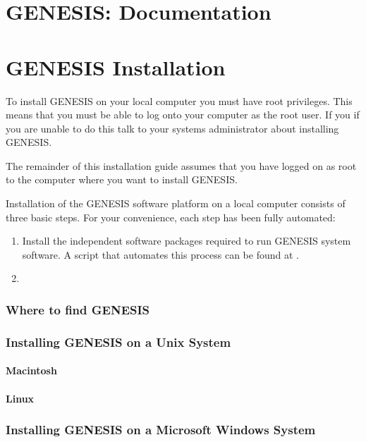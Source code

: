 \documentclass[12pt]{article}
\begin{document}
\section*{GENESIS: Documentation}

\section*{GENESIS Installation}

To install GENESIS on your local computer you must have root privileges. This means that you must be able to log onto your computer as the root user. If you if you are unable to do this talk to your systems administrator about installing GENESIS.

The remainder of this installation guide assumes that you have logged on as root to the computer where you want to install GENESIS.

Installation of the GENESIS software platform on a local computer consists of three basic steps. For your convenience, each step has been fully automated:

\begin {enumerate}

\item Install the independent software packages required to run GENESIS system software. A script that automates this process can be found at \href{}{}.

\item 

\end{enumerate}

\subsubsection*{Where to find GENESIS}

\subsubsection*{Installing GENESIS on a Unix System}

\paragraph*{Macintosh}

\paragraph*{Linux}

\subsubsection*{Installing GENESIS on a Microsoft Windows System}
\end{document}
